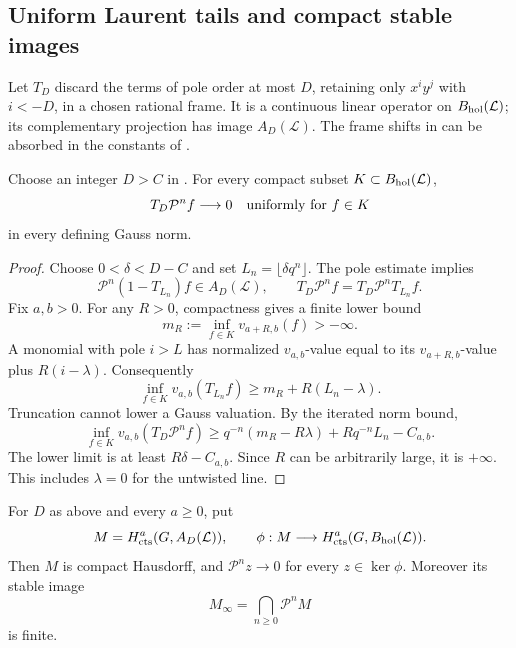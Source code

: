 \subsection{Uniform Laurent tails and compact stable images}

Let $T_D$ discard the terms of pole order at most $D$, retaining only
$x^iy^j$ with $i<-D$, in a chosen rational frame.  It is a continuous
linear operator on $B_{\mathrm{hol}}(\mathcal L)$; its complementary
projection has image $A_D(\mathcal L)$.  The frame shifts in
 can be absorbed in the constants of
.

\begin{lemma}\label{h3:ord:tail-contraction}
Choose an integer $D>C$ in .
For every compact subset $K\subset B_{\mathrm{hol}}(\mathcal L)$,
\[
 T_D\mathcal P^nf\longrightarrow0
 \quad\hbox{uniformly for }f\in K
\]
in every defining Gauss norm.
\end{lemma}

\begin{proof}
Choose $0<\delta<D-C$ and set $L_n=\lfloor\delta q^n\rfloor$.
The pole estimate implies
\[
 \mathcal P^n(1-T_{L_n})f\in A_D(\mathcal L),\qquad
 T_D\mathcal P^nf=T_D\mathcal P^nT_{L_n}f.
\]
Fix $a,b>0$.  For any $R>0$, compactness gives a finite lower bound
\[
 m_R:=\inf_{f\in K}v_{a+R,b}(f)>-\infty.
\]
A monomial with pole $i>L$ has normalized $v_{a,b}$-value equal
to its $v_{a+R,b}$-value plus $R(i-\lambda)$.  Consequently
\[
 \inf_{f\in K}v_{a,b}(T_{L_n}f)\geq m_R+R(L_n-\lambda).
\]
Truncation cannot lower a Gauss valuation.  By the iterated norm bound,
\begin{equation}\label{h3:ord:quantitative-tail}
 \inf_{f\in K}v_{a,b}(T_D\mathcal P^nf)
   \geq q^{-n}(m_R-R\lambda)+Rq^{-n}L_n-C_{a,b}.
\end{equation}
The lower limit is at least $R\delta-C_{a,b}$.  Since $R$ can
be arbitrarily large, it is $+\infty$.  This includes $\lambda=0$
for the untwisted line.
\end{proof}

\begin{lemma}\label{h3:ord:stable-image}
For $D$ as above and every $a\geq0$, put
\[
 M=H^a_{\mathrm{cts}}(G,A_D(\mathcal L)),\qquad
 \phi:M\longrightarrow H^a_{\mathrm{cts}}(G,B_{\mathrm{hol}}(\mathcal L)).
\]
Then $M$ is compact Hausdorff, and
$\mathcal P^nz\to0$ for every $z\in\ker\phi$.
Moreover its stable image
\[
 M_\infty=\bigcap_{n\geq0}\mathcal P^nM
\]
is finite.
\end{lemma}

